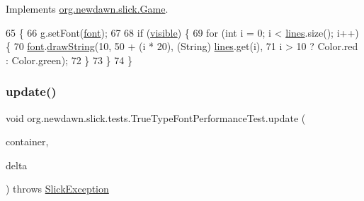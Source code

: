 Implements \mbox{\hyperlink{interfaceorg_1_1newdawn_1_1slick_1_1_game_af1a4670d43eb3ba04dfcf55ab1975b64}{org.\+newdawn.\+slick.\+Game}}.


\begin{DoxyCode}
65                                                             \{
66         g.setFont(\mbox{\hyperlink{classorg_1_1newdawn_1_1slick_1_1tests_1_1_true_type_font_performance_test_a9467d66083a8e6d0f93ee5290e49896d}{font}});
67 
68         \textcolor{keywordflow}{if} (\mbox{\hyperlink{classorg_1_1newdawn_1_1slick_1_1tests_1_1_true_type_font_performance_test_aff78102bb4082a1dd8e34dc6152a51b2}{visible}}) \{
69             \textcolor{keywordflow}{for} (\textcolor{keywordtype}{int} i = 0; i < \mbox{\hyperlink{classorg_1_1newdawn_1_1slick_1_1tests_1_1_true_type_font_performance_test_a321f5b369149b9e1892239932b2828ae}{lines}}.size(); i++) \{
70                 \mbox{\hyperlink{classorg_1_1newdawn_1_1slick_1_1tests_1_1_true_type_font_performance_test_a9467d66083a8e6d0f93ee5290e49896d}{font}}.\mbox{\hyperlink{classorg_1_1newdawn_1_1slick_1_1_true_type_font_a348f5304a388040ffe1d87b2f17487de}{drawString}}(10, 50 + (i * 20), (String) \mbox{\hyperlink{classorg_1_1newdawn_1_1slick_1_1tests_1_1_true_type_font_performance_test_a321f5b369149b9e1892239932b2828ae}{lines}}.get(i),
71                         i > 10 ? Color.red : Color.green);
72             \}
73         \}
74     \}
\end{DoxyCode}
\mbox{\label{classorg_1_1newdawn_1_1slick_1_1tests_1_1_true_type_font_performance_test_a86f3d4df072362a3725c116eccf37a39}} 
\subsubsection{\texorpdfstring{update()}{update()}}
{\footnotesize\ttfamily void org.\+newdawn.\+slick.\+tests.\+True\+Type\+Font\+Performance\+Test.\+update (\begin{DoxyParamCaption}\item[{\mbox{\hyperlink{classorg_1_1newdawn_1_1slick_1_1_game_container}{Game\+Container}}}]{container,  }\item[{int}]{delta }\end{DoxyParamCaption}) throws \mbox{\hyperlink{classorg_1_1newdawn_1_1slick_1_1_slick_exception}{Slick\+Exception}}\hspace{0.3cm}{\ttfamily [inline]}}


